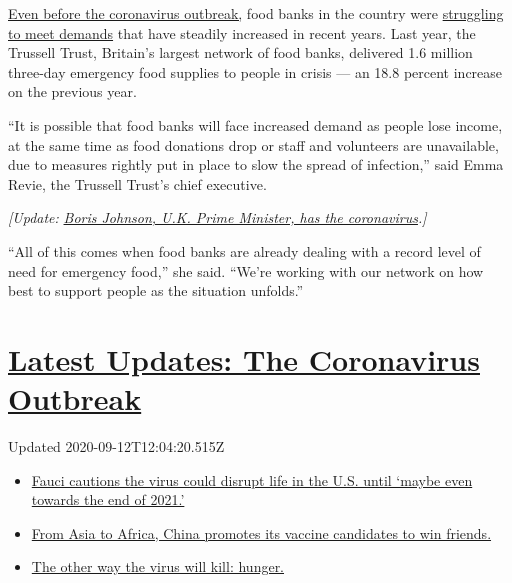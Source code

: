 \href{https://www.nytimes3xbfgragh.onion/2020/03/16/world/europe/britain-coronavirus-boris-johnson.html}{Even
before the coronavirus outbreak,} food banks in the country were
\href{https://www.nytimes3xbfgragh.onion/2019/01/30/sports/britain-premier-league-foodbanks.html}{struggling
to meet demands} that have steadily increased in recent years. Last
year, the Trussell Trust, Britain's largest network of food banks,
delivered 1.6 million three-day emergency food supplies to people in
crisis --- an 18.8 percent increase on the previous year.

``It is possible that food banks will face increased demand as people
lose income, at the same time as food donations drop or staff and
volunteers are unavailable, due to measures rightly put in place to slow
the spread of infection,'' said Emma Revie, the Trussell Trust's chief
executive.

\emph{{[}Update:}
\href{http://www.nytimes3xbfgragh.onion/2020/03/27/world/europe/boris-johnson-coronavirus.html}{\emph{Boris
Johnson, U.K. Prime Minister, has the coronavirus}}\emph{.{]}}

``All of this comes when food banks are already dealing with a record
level of need for emergency food,'' she said. ``We're working with our
network on how best to support people as the situation unfolds.''

\hypertarget{latest-updates-the-coronavirus-outbreak}{%
\section{\texorpdfstring{\href{https://www.nytimes3xbfgragh.onion/2020/09/11/world/covid-19-coronavirus.html?action=click\&pgtype=Article\&state=default\&region=MAIN_CONTENT_1\&context=storylines_live_updates}{Latest
Updates: The Coronavirus
Outbreak}}{Latest Updates: The Coronavirus Outbreak}}\label{latest-updates-the-coronavirus-outbreak}}

Updated 2020-09-12T12:04:20.515Z

\begin{itemize}
\tightlist
\item
  \href{https://www.nytimes3xbfgragh.onion/2020/09/11/world/covid-19-coronavirus.html?action=click\&pgtype=Article\&state=default\&region=MAIN_CONTENT_1\&context=storylines_live_updates\#link-dfb8a16}{Fauci
  cautions the virus could disrupt life in the U.S. until `maybe even
  towards the end of 2021.'}
\item
  \href{https://www.nytimes3xbfgragh.onion/2020/09/11/world/covid-19-coronavirus.html?action=click\&pgtype=Article\&state=default\&region=MAIN_CONTENT_1\&context=storylines_live_updates\#link-7104d154}{From
  Asia to Africa, China promotes its vaccine candidates to win friends.}
\item
  \href{https://www.nytimes3xbfgragh.onion/2020/09/11/world/covid-19-coronavirus.html?action=click\&pgtype=Article\&state=default\&region=MAIN_CONTENT_1\&context=storylines_live_updates\#link-393ad215}{The
  other way the virus will kill: hunger.}
\end{itemize}

